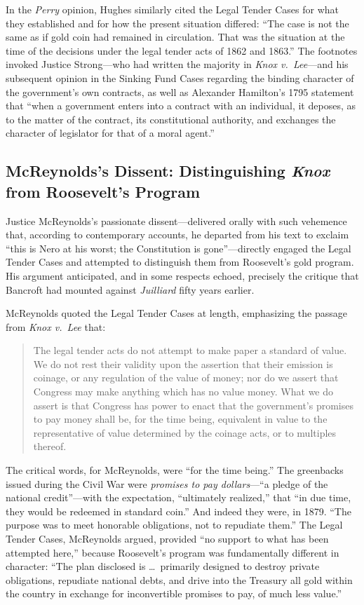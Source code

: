 \documentclass[12pt]{article}
\begin{document}
In the \textit{Perry} opinion, Hughes similarly cited the Legal Tender
Cases for what they established and for how the present situation
differed: ``The case is not the same as if gold coin had remained in
circulation. That was the situation at the time of the decisions under
the legal tender acts of 1862 and 1863.'' The footnotes invoked Justice
Strong---who had written the majority in \textit{Knox v.\ Lee}---and
his subsequent opinion in the Sinking Fund Cases regarding the binding
character of the government's own contracts, as well as Alexander
Hamilton's 1795 statement that ``when a government enters into a
contract with an individual, it deposes, as to the matter of the
contract, its constitutional authority, and exchanges the character of
legislator for that of a moral agent.''

\subsection{McReynolds's Dissent: Distinguishing \textit{Knox} from
Roosevelt's Program}

Justice McReynolds's passionate dissent---delivered orally with such
vehemence that, according to contemporary accounts, he departed from
his text to exclaim ``this is Nero at his worst; the Constitution is
gone''---directly engaged the Legal Tender Cases and attempted to
distinguish them from Roosevelt's gold program. His argument
anticipated, and in some respects echoed, precisely the critique that
Bancroft had mounted against \textit{Juilliard} fifty years earlier.

McReynolds quoted the Legal Tender Cases at length, emphasizing the
passage from \textit{Knox v.\ Lee} that:
\begin{quote}
The legal tender acts do not attempt to make paper a standard of value.
We do not rest their validity upon the assertion that their emission is
coinage, or any regulation of the value of money; nor do we assert that
Congress may make anything which has no value money. What we do assert
is that Congress has power to enact that the government's promises to
pay money shall be, for the time being, equivalent in value to the
representative of value determined by the coinage acts, or to multiples
thereof.
\end{quote}

The critical words, for McReynolds, were ``for the time being.'' The
greenbacks issued during the Civil War were \textit{promises to pay
dollars}---``a pledge of the national credit''---with the expectation,
``ultimately realized,'' that ``in due time, they would be redeemed in
standard coin.'' And indeed they were, in 1879. ``The purpose was to
meet honorable obligations, not to repudiate them.'' The Legal Tender
Cases, McReynolds argued, provided ``no support to what has been
attempted here,'' because Roosevelt's program was fundamentally
different in character: ``The plan disclosed is \ldots\ primarily
designed to destroy private obligations, repudiate national debts, and
drive into the Treasury all gold within the country in exchange for
inconvertible promises to pay, of much less value.''
\end{document}
